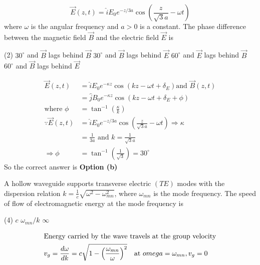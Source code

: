 \begin{enumerate}
\begin{minipage}{\textwidth}
		$$
		\vec{E}(z, t)=\hat{i} E_{0} e^{-z / 3 a} \cos \left(\frac{z}{\sqrt{3} a}-\omega t\right)
		$$
		where $\omega$ is the angular frequency and $a>0$ is a constant. The phase difference between the magnetic field $\vec{B}$ and the electric field $\vec{E}$ is
	\end{minipage}
	\begin{tasks}(2)
		\task[\textbf{a.}] $30^{\circ}$ and $\vec{B}$ lags behind $\vec{B}$
		\task[\textbf{b.}]$30^{\circ}$ and $\vec{B}$ lags behind $\vec{E}$
		\task[\textbf{c.}]$60^{\circ}$ and $\vec{E}$ lags behind $\vec{B}$
		\task[\textbf{d.}]$60^{\circ}$ and $\vec{B}$ lags behind $\vec{E}$
	\end{tasks}
\begin{answer}
	\begin{align*}
	\vec{E}(z, t)&=\hat{i} E_{0} e^{-\kappa z} \cos \left(k z-\omega t+\delta_{E}\right) \text{and }\vec{B}(z, t)\\&=\hat{j} B_{0} e^{-\kappa z} \cos \left(k z-\omega t+\delta_{E}+\phi\right)\\
	\text{where }\phi&=\tan ^{-1}\left(\frac{\kappa}{k}\right)\\
	\because \vec{E}(z, t)&=\hat{i} E_{0} e^{-z / 3 a} \cos \left(\frac{z}{\sqrt{3} a}-\omega t\right) \Rightarrow \kappa\\&=\frac{1}{3 a}\text{ and }k=\frac{1}{\sqrt{3} a}\\
	\Rightarrow \phi&=\tan ^{-1}\left(\frac{1}{\sqrt{3}}\right)=30^{\circ}
	\end{align*}
	So the correct answer is \textbf{Option (b)}
\end{answer}
	\begin{minipage}{\textwidth}
		\item A hollow waveguide supports transverse electric $(T E)$ modes with the dispersion relation $k=\frac{1}{c} \sqrt{\omega^{2}-\omega_{m n}^{2}}$, where $\omega_{m n}$ is the mode frequency. The speed of flow of electromagnetic energy at the mode frequency is
	\end{minipage}
	\begin{tasks}(4)
		\task[\textbf{a.}] $c$
		\task[\textbf{b.}] $\omega_{m n} / k$
		\task[\textbf{d.}] $\infty$
	\end{tasks}
\begin{answer}
	\begin{align*}
	\intertext{Energy carried by the wave travels at the group velocity}
	v_{g}
	&=\frac{d \omega}{d k}=c \sqrt{1-\left(\frac{\omega_{m n}}{\omega}\right)^{2}} \quad \text{at }omega=\omega_{m n}, v_{g}=0

\end{align*}
\end{answer}
\end{enumerate}
